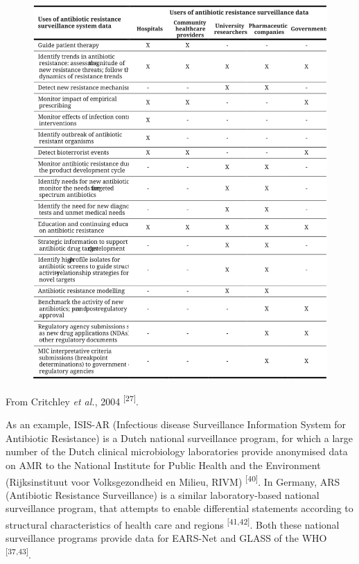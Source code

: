 \documentclass[
]{book}
\begin{document}
\begin{figure}

{\centering \includegraphics[width=1\linewidth]{images/01-t01} 

}

\end{figure}

From Critchley \emph{et al.}, 2004 \textsuperscript{{[}27{]}}.

As an example, ISIS-AR (Infectious disease Surveillance Information System for Antibiotic Resistance) is a Dutch national surveillance program, for which a large number of the Dutch clinical microbiology laboratories provide anonymised data on AMR to the National Institute for Public Health and the Environment (Rijksinstituut voor Volksgezondheid en Milieu, RIVM) \textsuperscript{{[}40{]}}. In Germany, ARS (Antibiotic Resistance Surveillance) is a similar laboratory-based national surveillance program, that attempts to enable differential statements according to structural characteristics of health care and regions \textsuperscript{{[}41,42{]}}. Both these national surveillance programs provide data for EARS-Net and GLASS of the WHO \textsuperscript{{[}37,43{]}}.
\end{document}
